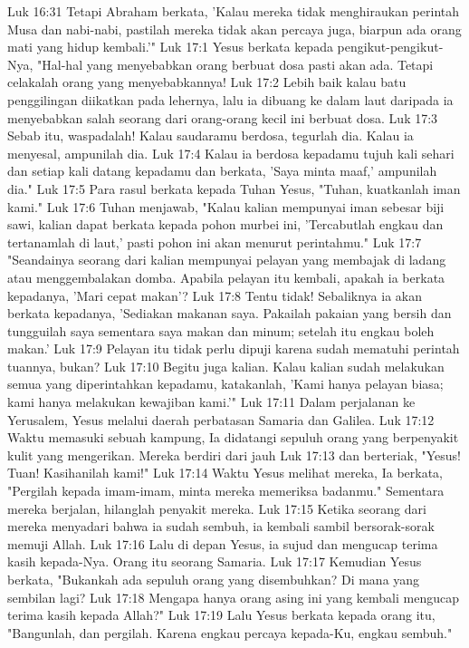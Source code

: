Luk 16:31  Tetapi Abraham berkata, 'Kalau mereka tidak menghiraukan perintah Musa dan nabi-nabi, pastilah mereka tidak akan percaya juga, biarpun ada orang mati yang hidup kembali.'"
Luk 17:1  Yesus berkata kepada pengikut-pengikut-Nya, "Hal-hal yang menyebabkan orang berbuat dosa pasti akan ada. Tetapi celakalah orang yang menyebabkannya!
Luk 17:2  Lebih baik kalau batu penggilingan diikatkan pada lehernya, lalu ia dibuang ke dalam laut daripada ia menyebabkan salah seorang dari orang-orang kecil ini berbuat dosa.
Luk 17:3  Sebab itu, waspadalah! Kalau saudaramu berdosa, tegurlah dia. Kalau ia menyesal, ampunilah dia.
Luk 17:4  Kalau ia berdosa kepadamu tujuh kali sehari dan setiap kali datang kepadamu dan berkata, 'Saya minta maaf,' ampunilah dia."
Luk 17:5  Para rasul berkata kepada Tuhan Yesus, "Tuhan, kuatkanlah iman kami."
Luk 17:6  Tuhan menjawab, "Kalau kalian mempunyai iman sebesar biji sawi, kalian dapat berkata kepada pohon murbei ini, 'Tercabutlah engkau dan tertanamlah di laut,' pasti pohon ini akan menurut perintahmu."
Luk 17:7  "Seandainya seorang dari kalian mempunyai pelayan yang membajak di ladang atau menggembalakan domba. Apabila pelayan itu kembali, apakah ia berkata kepadanya, 'Mari cepat makan'?
Luk 17:8  Tentu tidak! Sebaliknya ia akan berkata kepadanya, 'Sediakan makanan saya. Pakailah pakaian yang bersih dan tungguilah saya sementara saya makan dan minum; setelah itu engkau boleh makan.'
Luk 17:9  Pelayan itu tidak perlu dipuji karena sudah mematuhi perintah tuannya, bukan?
Luk 17:10  Begitu juga kalian. Kalau kalian sudah melakukan semua yang diperintahkan kepadamu, katakanlah, 'Kami hanya pelayan biasa; kami hanya melakukan kewajiban kami.'"
Luk 17:11  Dalam perjalanan ke Yerusalem, Yesus melalui daerah perbatasan Samaria dan Galilea.
Luk 17:12  Waktu memasuki sebuah kampung, Ia didatangi sepuluh orang yang berpenyakit kulit yang mengerikan. Mereka berdiri dari jauh
Luk 17:13  dan berteriak, "Yesus! Tuan! Kasihanilah kami!"
Luk 17:14  Waktu Yesus melihat mereka, Ia berkata, "Pergilah kepada imam-imam, minta mereka memeriksa badanmu." Sementara mereka berjalan, hilanglah penyakit mereka.
Luk 17:15  Ketika seorang dari mereka menyadari bahwa ia sudah sembuh, ia kembali sambil bersorak-sorak memuji Allah.
Luk 17:16  Lalu di depan Yesus, ia sujud dan mengucap terima kasih kepada-Nya. Orang itu seorang Samaria.
Luk 17:17  Kemudian Yesus berkata, "Bukankah ada sepuluh orang yang disembuhkan? Di mana yang sembilan lagi?
Luk 17:18  Mengapa hanya orang asing ini yang kembali mengucap terima kasih kepada Allah?"
Luk 17:19  Lalu Yesus berkata kepada orang itu, "Bangunlah, dan pergilah. Karena engkau percaya kepada-Ku, engkau sembuh."

